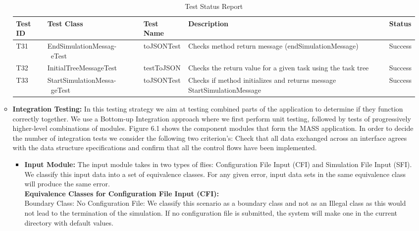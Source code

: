 \begin{enumerate}
\begin{itemize}
\begin{table}[H] 
\caption{Test Status Report} %
\begin{tabular}{| l | p{4cm} | p{4cm} | p{4cm} | l |} %
\hline\hline %
 Test ID & Test Class &Test Name &  Description & Status \\ [0.5ex] %
\hline %
T31 & EndSimulationMessag- \ eTest & toJSONTest &  Checks method return message (endSimulationMessage)  & Success \\
T32 & InitialTreeMessageTest & testToJSON & Checks the return value for a given task using the task tree & Success \\ 
T33 & StartSimulationMessa- \ geTest &  toJSONTest & Checks if method initializes and returns message StartSimulationMessage &  Success \\  
\hline %
\end{tabular} 
\label{table:nonlin} %
\end{table}

\item \textbf{Integration Testing:}  In this testing strategy we aim at testing combined parts of the application to determine if they function correctly together. We use a Bottom-up Integration approach where we first perform unit testing, followed by tests of progressively higher-level combinations of modules. Figure 6.1 shows the component modules that form the MASS application.
 In order to decide the number of integration tests we consider the following two criterion's: Check that all data exchanged across an interface agrees with the data structure specifications and confirm that all the control flows have been implemented.

\begin{itemize}

\item \textbf{Input Module:} The input module takes in two types of flies: Configuration File Input (CFI) and Simulation File Input (SFI). We classify this input data into a set of equivalence classes. For any given error, input data sets in the same equivalence class will produce the same error. \\

\textbf{Equivalence Classes for Configuration File Input (CFI):} \\
Boundary Class: No Configuration File: We classify this scenario as a boundary class and not as an Illegal class as this would not lead to the termination of the simulation. If no configuration file is submitted, the system will make one in the current directory with default values. \\


\end{itemize}
\end{itemize}
\end{enumerate}
